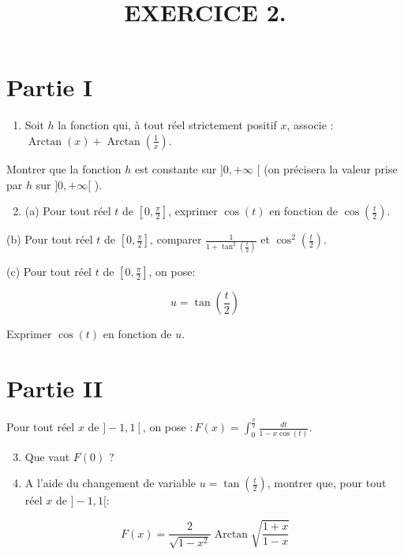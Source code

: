 \documentclass[10pt]{article}
\title{EXERCICE 2. }
\author{}
\date{}
\begin{document}
\maketitle
\section{Partie I}
\begin{enumerate}
  \item Soit $h$ la fonction qui, à tout réel strictement positif $x$, associe : $\operatorname{Arctan}(x)+\operatorname{Arctan}\left(\frac{1}{x}\right)$.
\end{enumerate}

Montrer que la fonction $h$ est constante sur $] 0,+\infty$ [ (on précisera la valeur prise par $h$ sur $] 0,+\infty[$ ).

\begin{enumerate}
  \setcounter{enumi}{1}
  \item (a) Pour tout réel $t$ de $\left[0, \frac{\pi}{2}\right]$, exprimer $\cos (t)$ en fonction de $\cos \left(\frac{t}{2}\right)$.
\end{enumerate}

(b) Pour tout réel $t$ de $\left[0, \frac{\pi}{2}\right]$, comparer $\frac{1}{1+\tan ^{2}\left(\frac{t}{2}\right)}$ et $\cos ^{2}\left(\frac{t}{2}\right)$.

(c) Pour tout réel $t$ de $\left[0, \frac{\pi}{2}\right]$, on pose:

$$
u=\tan \left(\frac{t}{2}\right)
$$

Exprimer $\cos (t)$ en fonction de $u$.

\section{Partie II}
Pour tout réel $x$ de $]-1,1\left[\right.$, on pose $: F(x)=\int_{0}^{\frac{\pi}{2}} \frac{d t}{1-x \cos (t)}$.

\begin{enumerate}
  \setcounter{enumi}{2}
  \item Que vaut $F(0)$ ?

  \item A l'aide du changement de variable $u=\tan \left(\frac{t}{2}\right)$, montrer que, pour tout réel $x$ de $]-1,1[:$

\end{enumerate}

$$
F(x)=\frac{2}{\sqrt{1-x^{2}}} \operatorname{Arctan} \sqrt{\frac{1+x}{1-x}}
$$
\end{document}
